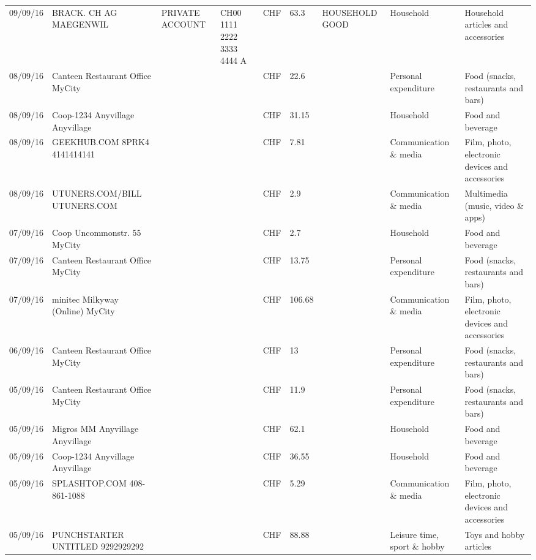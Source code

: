 \begin{landscape}
\begin{center}
\begin{longtable}{lllllllll}
		09/09/16 & BRACK. CH AG MAEGENWIL & PRIVATE ACCOUNT & CH00 1111 2222 3333 4444 A & CHF   & 63.3  & HOUSEHOLD GOOD & Household & Household articles and accessories \\
		08/09/16 & Canteen Restaurant Office      MyCity &       &       & CHF   & 22.6  &       & Personal expenditure & Food (snacks, restaurants and bars) \\
		08/09/16 & Coop-1234 Anyvillage    Anyvillage &       &       & CHF   & 31.15 &       & Household & Food and beverage \\
		08/09/16 & GEEKHUB.COM  8PRK4        4141414141 &       &       & CHF   & 7.81  &       & Communication \& media & Film, photo, electronic devices and accessories \\
		08/09/16 & UTUNERS.COM/BILL          UTUNERS.COM &       &       & CHF   & 2.9   &       & Communication \& media & Multimedia (music, video \& apps) \\
		07/09/16 & Coop Uncommonstr. 55   MyCity &       &       & CHF   & 2.7   &       & Household & Food and beverage \\
		07/09/16 & Canteen Restaurant Office      MyCity &       &       & CHF   & 13.75 &       & Personal expenditure & Food (snacks, restaurants and bars) \\
		07/09/16 & minitec Milkyway (Online) MyCity &       &       & CHF   & 106.68 &       & Communication \& media & Film, photo, electronic devices and accessories \\
		06/09/16 & Canteen Restaurant Office      MyCity &       &       & CHF   & 13    &       & Personal expenditure & Food (snacks, restaurants and bars) \\
		05/09/16 & Canteen Restaurant Office      MyCity &       &       & CHF   & 11.9  &       & Personal expenditure & Food (snacks, restaurants and bars) \\
		05/09/16 & Migros MM Anyvillage    Anyvillage &       &       & CHF   & 62.1  &       & Household & Food and beverage \\
		05/09/16 & Coop-1234 Anyvillage    Anyvillage &       &       & CHF   & 36.55 &       & Household & Food and beverage \\
		05/09/16 & SPLASHTOP.COM            408-861-1088 &       &       & CHF   & 5.29  &       & Communication \& media & Film, photo, electronic devices and accessories \\
		05/09/16 & PUNCHSTARTER UNTITLED     9292929292 &       &       & CHF   & 88.88 &       & Leisure time, sport \& hobby & Toys and hobby articles \\

\end{longtable}
\end{center}
\end{landscape}
